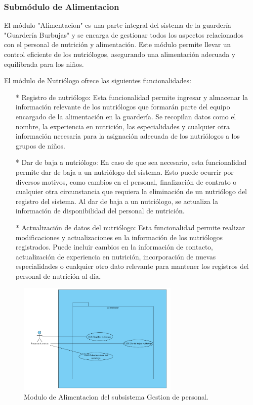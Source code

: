 \subsubsection{Submódulo de Alimentacion}

El módulo "Alimentacion" es una parte integral del sistema de la guardería "Guardería Burbujas" y se encarga de gestionar todos los aspectos relacionados con el personal de nutrición y alimentación. Este módulo permite llevar un control eficiente de los nutriólogos, asegurando una alimentación adecuada y equilibrada para los niños.

El módulo de Nutriólogo ofrece las siguientes funcionalidades:

\begin{itemize}
\item[*] Registro de nutriólogo: Esta funcionalidad permite ingresar y almacenar la información relevante de los nutriólogos que formarán parte del equipo encargado de la alimentación en la guardería. Se recopilan datos como el nombre, la experiencia en nutrición, las especialidades y cualquier otra información necesaria para la asignación adecuada de los nutriólogos a los grupos de niños.
\item[*] Dar de baja a nutriólogo: En caso de que sea necesario, esta funcionalidad permite dar de baja a un nutriólogo del sistema. Esto puede ocurrir por diversos motivos, como cambios en el personal, finalización de contrato o cualquier otra circunstancia que requiera la eliminación de un nutriólogo del registro del sistema. Al dar de baja a un nutriólogo, se actualiza la información de disponibilidad del personal de nutrición.
\item[*] Actualización de datos del nutriólogo: Esta funcionalidad permite realizar modificaciones y actualizaciones en la información de los nutriólogos registrados. Puede incluir cambios en la información de contacto, actualización de experiencia en nutrición, incorporación de nuevas especialidades o cualquier otro dato relevante para mantener los registros del personal de nutrición al día.
\end{itemize}


\begin{figure}[htbp]
\centering
\includegraphics[width=0.7\textwidth]{images/arqui/subConsulAlimentac.png}
\caption{Modulo de Alimentacion del subsistema Gestion de personal.}
\label{fig:subsistGestalim}
\end{figure}


